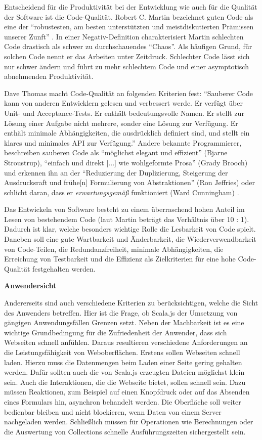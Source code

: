 \documentclass[a4paper, 12pt, hidelinks, listof=totoc, listoftables=totoc, bibliography=totoc]{scrreprt}
\newcommand{\MyMiniSec}[1]{\rmfamily\fontsize{12}{15}\selectfont
	\vspace{7pt}\textbf{#1} %
}
\begin{document}
Entscheidend für die Produktivität bei der Entwicklung wie auch für die Qualität der Software ist die Code-Qualität. Robert C. Martin bezeichnet guten Code als eine der "`robustesten, am besten unterstützten und meistdiskutierten Prämissen unserer Zunft"' \cite[S. 27]{martin2009.CCH}. In einer Negativ-Definition charakterisiert Martin schlechten Code drastisch als schwer zu durchschauendes "`Chaos"'. Als häufigen Grund, für solchen Code nennt er das Arbeiten unter Zeitdruck. Schlechter Code lässt sich nur schwer ändern und führt zu mehr schlechtem Code und einer asymptotisch abnehmenden Produktivität. \cite[S. 27 f.]{martin2009.CCH}

Dave Thomas macht Code-Qualität an folgenden Kriterien fest: "`Sauberer Code kann von anderen Entwicklern gelesen und verbessert werde. Er verfügt über Unit- und Acceptance-Tests. Er enthält bedeutungsvolle Namen. Er stellt zur Lösung einer Aufgabe nicht mehrere, sonder eine Lösung zur Verfügung. Er enthält minimale Abhängigkeiten, die ausdrücklich definiert sind, und stellt ein klares und minimales API zur Verfügung."' \cite[zit. nach: ][S. 35]{martin2009.CCH} Andere bekannte Programmierer, beschreiben sauberen Code als "`möglichst elegant und effizient"' (Bjarne Stroustrup), "`einfach und direkt [...] wie wohlgeformte Prosa"' (Grady Brooch) und erkennen ihn an der "`Reduzierung der Duplizierung, Steigerung der Ausdrucksraft und frühe[n] Formulierung von Abstraktionen"' (Ron Jeffries) oder schlicht daran, dass er \emph{erwartungsgemäß} funktioniert (Ward Cunningham) \cite[alle zit. nach: ][S. 32 ff.]{martin2009.CCH}.

Das Entwickeln von Software besteht zu einem überraschend hohen Anteil im Lesen von bestehendem Code (laut Martin beträgt das Verhältnis über 10 : 1)\cite[S. 42]{martin2009.CCH}. Dadurch ist klar, welche besonders wichtige Rolle die Lesbarkeit von Code spielt. Daneben soll eine gute Wartbarkeit und Änderbarkeit, die Wiederverwendbarkeit von Code-Teilen, die Redundanzfreiheit, minimale Abhängigkeiten, die Erreichung von Testbarkeit und die Effizienz als Zielkriterien für eine hohe Code-Qualität festgehalten werden.

\MyMiniSec{Anwendersicht}

Andererseits sind auch verschiedene Kriterien zu berücksichtigen, welche die Sicht des Anwenders betreffen. Hier ist die Frage, ob Scala.js der Umsetzung von gängigen Anwendungsfällen Grenzen setzt. Neben der Machbarkeit ist es eine wichtige Grundbedingung für die Zufriedenheit der Anwender, dass sich Webseiten schnell anfühlen. Daraus resultieren verschiedene Anforderungen an die Leistungsfähigkeit von Weboberflächen. Erstens sollen Webseiten schnell laden. Hierzu muss die Datenmengen beim Laden einer Seite gering gehalten werden. Dafür sollten auch die von Scala.js erzeugten Dateien möglichst klein sein. Auch die Interaktionen, die die Webseite bietet, sollen schnell sein. Dazu müssen Reaktionen, zum Beispiel auf einen Knopfdruck oder auf das Absenden eines Formulars hin, asynchron behandelt werden. Die Oberfläche soll weiter bedienbar bleiben und nicht blockieren, wenn Daten von einem Server nachgeladen werden. Schließlich müssen für Operationen wie Berechnungen oder die Auswertung von Collections schnelle Ausführungszeiten sichergestellt sein.
\end{document}
